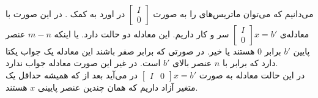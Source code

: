 \\
می‌دانیم که می‌توان ماتریس‌های
را به صورت
$\begin{bmatrix}
    I \\ 0
\end{bmatrix}$
در اورد به کمک
.
در این صورت با معادله‌ی
$\begin{bmatrix}
    I \\ 0
\end{bmatrix} x = b'$
سر و کار داریم.
این معادله دو حالت دارد. یا اینکه
$m-n$
عنصر پایین
$b'$
برابر 0 هستند یا خیر. در صورتی که برابر صفر باشند این معادله یک جواب یکتا دارد که برابر با
$n$
عنصر بالای
$b'$
است.
در غیر این صورت معادله جواب ندارد.
\\
در این حالت معادله به صورت
$\begin{bmatrix}
    I & 0
\end{bmatrix} x = b'$
در می‌آید بعد از
که همیشه حداقل یک متغیر آزاد داریم که همان چندین عنصر پایینی
$x$
هستند.


